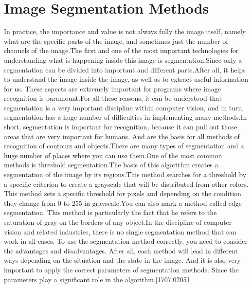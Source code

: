 \section{Image Segmentation Methods}\label{sec:3.4}
\vspace{-0.5cm}
\noindent In practice, the importance and value is not always fully the image itself, namely what are the specific parts of the image, and sometimes just the number of channels of the image.The first and one of the most important technologies for understanding what is happening inside this image is segmentation.Since only a segmentation can be divided into important and different parts.After all, it helps to understand the image inside the image, as well as to extract useful information for us.  These aspects are extremely important for programs where image recognition is paramount.For all these reasons, it can be understood that segmentation is a very important discipline within computer vision, and in turn, segmentation has a huge number of difficulties in implementing many methods.In short, segmentation is important for recognition, because it can pull out those areas that are very important for humans. And are the basis for all methods of recognition of contours and objects.There are many types of segmentation and a huge number of places where you can use them.One of the most common methods is threshold segmentation.The basis of this algorithm creates a segmentation of the image by its regions.This method searches for a threshold by a specific criterion to create a grayscale that will be distributed from other colors. This method sets a specific threshold for pixels and depending on the condition they change from 0 to 255 in grayscale.You can also mark a method called edge segmentation. This method is particularly the fact that he refers to the saturation of gray on the borders of any object.In the discipline of computer vision and related industries, there is no single segmentation method that can work in all cases. To use the segmentation method correctly, you need to consider the advantages and disadvantages. After all, each method will lead in different ways depending on the situation and the state in the image. And it is also very important to apply the correct parameters of segmentation methods. Since the parameters play a significant role in the algorithm.[1707.02051]

